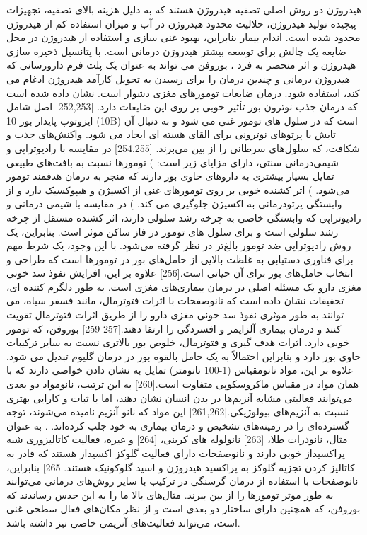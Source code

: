 هیدروژن دو روش اصلی تصفیه هیدروژن هستند که به دلیل هزینه بالای تصفیه، تجهیزات پیچیده تولید هیدروژن، حلالیت محدود هیدروژن در آب و میزان استفاده کم از هیدروژن محدود شده است. اندام بیمار بنابراین، بهبود غنی سازی و استفاده از هیدروژن در محل ضایعه یک چالش برای توسعه بیشتر هیدروژن درمانی است. با پتانسیل ذخیره سازی هیدروژن و اثر منحصر به فرد ، بوروفن می تواند به عنوان یک پلت فرم دارورسانی که هیدروژن درمانی و چندین درمان را برای رسیدن به تحویل کارآمد هیدروژن ادغام می کند، استفاده شود. درمان ضایعات تومورهای مغزی دشوار است. نشان داده شده است که درمان جذب نوترون بور  تأثیر خوبی بر روی این ضایعات دارد. [252,253] اصل  شامل ایزوتوپ پایدار بور-10 (10B) است که در سلول های تومور غنی می شود و به دنبال آن تابش با پرتوهای نوترونی برای القای هسته ای ایجاد می شود. واکنش‌های جذب و شکافت، که سلول‌های سرطانی را از بین می‌برند. [254,255] در مقایسه با رادیوتراپی و شیمی‌درمانی سنتی،  دارای مزایای زیر است: ) تومورها نسبت به بافت‌های طبیعی تمایل بسیار بیشتری به داروهای حاوی بور دارند که منجر به درمان هدفمند تومور می‌شود. )  اثر کشنده خوبی بر روی تومورهای غنی از اکسیژن و هیپوکسیک دارد و از وابستگی پرتودرمانی به اکسیژن جلوگیری می کند. ) در مقایسه با شیمی درمانی و رادیوتراپی که وابستگی خاصی به چرخه رشد سلولی دارند، اثر کشنده  مستقل از چرخه رشد سلولی است و برای سلول های تومور در فاز ساکن موثر است.
بنابراین،  یک روش رادیوتراپی ضد تومور بالغ‌تر در نظر گرفته می‌شود. با این وجود، یک شرط مهم برای فناوری  دستیابی به غلظت بالایی از حامل‌های بور در تومورها است که طراحی و انتخاب حامل‌های بور برای آن حیاتی است.[256] علاوه بر این، افزایش نفوذ سد خونی مغزی دارو یک مسئله اصلی در درمان بیماری‌های مغزی است. به طور دلگرم کننده ای، تحقیقات نشان داده است که نانوصفحات با اثرات فتوترمال، مانند فسفر سیاه، می توانند به طور موثری نفوذ سد خونی مغزی دارو را از طریق اثرات فتوترمال تقویت کنند و درمان بیماری آلزایمر و افسردگی را ارتقا دهند.\cite{chenBlackPhosphorusNanosheets2018, madsenNanoparticleloadedMacrophagemediatedPhotothermal2015, guoNutritionalStatusUnderfive2017}[257-259] بوروفن، که تومور خوبی دارد. اثرات هدف گیری و فتوترمال، خلوص بور بالاتری نسبت به سایر ترکیبات حاوی بور دارد و بنابراین احتمالاً به یک حامل بالقوه بور در درمان گلیوم تبدیل می شود. علاوه بر این، مواد نانومقیاس (1-100 نانومتر) تمایل به نشان دادن خواصی دارند که با همان مواد در مقیاس ماکروسکوپی متفاوت است.\cite{schollQuantumPlasmonResonances2012}[260] به این ترتیب، نانومواد دو بعدی می‌توانند فعالیتی مشابه آنزیم‌ها در بدن انسان نشان دهند، اما با ثبات و کارایی بهتری نسبت به آنزیم‌های بیولوژیکی.\cite{huoTumorselectiveCatalyticNanomedicine2017}[261,262] این مواد که نانو آنزیم نامیده می‌شوند، توجه گسترده‌ای را در زمینه‌های تشخیص و درمان بیماری به خود جلب کرده‌اند. . به عنوان مثال، نانوذرات طلا، \cite{huSurfaceEnhancedRamanScattering2017}[263] نانولوله های کربنی، [264] و غیره، فعالیت کاتالیزوری شبه پراکسیداز خوبی دارند و نانوصفحات  دارای فعالیت گلوکز اکسیداز هستند که قادر به کاتالیز کردن تجزیه گلوکز به پراکسید هیدروژن و اسید گلوکونیک هستند. 265] بنابراین، نانوصفحات   با استفاده از درمان گرسنگی در ترکیب با سایر روش‌های درمانی می‌توانند به طور موثر تومورها را از بین ببرند. مثال‌های بالا ما را به این حدس رساندند که بوروفن، که همچنین دارای ساختار دو بعدی است و از نظر مکان‌های فعال سطحی غنی است، می‌تواند فعالیت‌های آنزیمی خاصی نیز داشته باشد.
